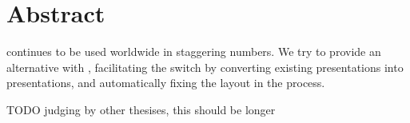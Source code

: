 
 \chapter*{Abstract}

  \ppt* continues to be used worldwide in staggering numbers. We try to provide
  an alternative with \mxp, facilitating the switch by converting existing \ppt
  presentations into \mxp presentations, and automatically fixing the layout in
  the process.

  TODO judging by other thesises, this should be longer

